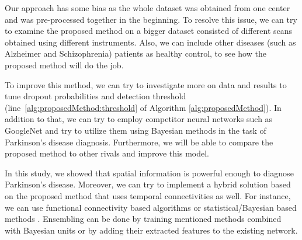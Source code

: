 \documentclass[preprint,12pt]{elsarticle}
\begin{document}
Our approach has some bias as the whole dataset was obtained from one center and was pre-processed together in the beginning. To resolve this issue, we can try to examine the proposed method on a bigger dataset consisted of different scans obtained using different instruments. Also, we can include other diseases (such as Alzheimer and Schizophrenia) patients as healthy control, to see how the proposed method will do the job.

To improve this method, we can try to investigate more on data and results to tune dropout probabilities and detection threshold (line~\ref{alg:proposedMethod:threshold} of Algorithm \ref{alg:proposedMethod}). In addition to that, we can try to employ competitor neural networks such as GoogleNet and try to utilize them using Bayesian methods in the task of Parkinson's disease diagnosis. Furthermore, we will be able to compare the proposed method to other rivals and improve this model.

In this study, we showed that spatial information is powerful enough to diagnose Parkinson's disease. Moreover, we can try to implement a hybrid solution based on the proposed method that uses temporal connectivities as well. For instance, we can use functional connectivity based algorithms \cite{Lehmann2017}\cite{Leonardi2013}\cite{Liu2016}\cite{Liu2015}\cite{Ryali2012} or statistical/Bayesian based methods \cite{Ahmad2016}\cite{Oikonomou2013}\cite{Oikonomou2012}\cite{Power2012}\cite{Suk2016}. Ensembling can be done by training mentioned methods combined with Bayesian units or by adding their extracted features to the existing network.
\end{document}
